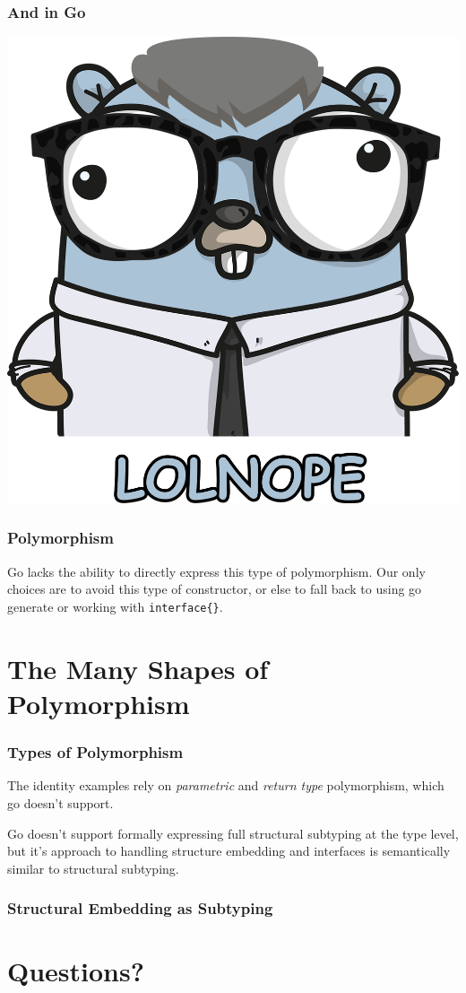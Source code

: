\documentclass{beamer}
\begin{document}
\begin{frame}
  \frametitle{And in Go}
    \begin{center}
    \includegraphics[height=.8\paperheight]{img/nopher}
  \end{center}
\end{frame}

\begin{frame}
  \frametitle{Polymorphism}
  Go lacks the ability to directly express this type of polymorphism.
  Our only choices are to avoid this type of constructor, or else to
  fall back to using go generate or working with \verb!interface{}!.
\end{frame}

\section{The Many Shapes of Polymorphism}

\begin{frame}
  \frametitle{Types of Polymorphism}
  The identity examples rely on {\it parametric} and {\it return type}
  polymorphism, which go doesn't support.

  Go doesn't support formally expressing full structural subtyping at
  the type level, but it's approach to handling structure embedding
  and interfaces is semantically similar to structural subtyping.
\end{frame}

\begin{frame}[fragile]
  \frametitle{Structural Embedding as Subtyping}

\end{frame}



\section{Questions?}
\end{document}
